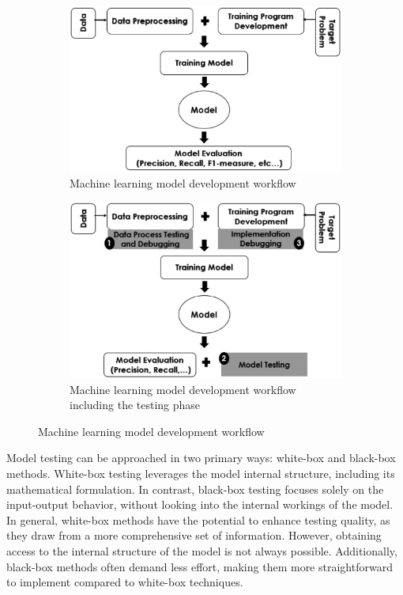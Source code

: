 \begin{figure}[h]
	\centering
	\begin{subfigure}{.5\textwidth}
		\centering
		\includegraphics[width=0.8\linewidth]{ImageFiles/StateOfArt/basic_model_dev}
		\caption{Machine learning model development workflow}
		\label{fig:basic_model_dev}
	\end{subfigure}%
	\begin{subfigure}{.5\textwidth}
		\centering
		\includegraphics[width=0.8\linewidth]{ImageFiles/StateOfArt/tnv_model_dev}
		\caption{Machine learning model development workflow including the testing phase}
		\label{fig:tnv_model_dev}
	\end{subfigure}
	\caption{Machine learning model development workflow \cite{BRAIEK2020110542}}
	\label{fig:model_dev_wf}
\end{figure}

Model testing can be approached in two primary ways: white-box and black-box methods. White-box testing leverages the model internal structure, including its mathematical formulation. In contrast, black-box testing focuses solely on the input-output behavior, without looking into the internal workings of the model. In general, white-box methods have the potential to enhance testing quality, as they draw from a more comprehensive set of information. However, obtaining access to the internal structure of the model is not always possible. Additionally, black-box methods often demand less effort, making them more straightforward to implement compared to white-box techniques.

